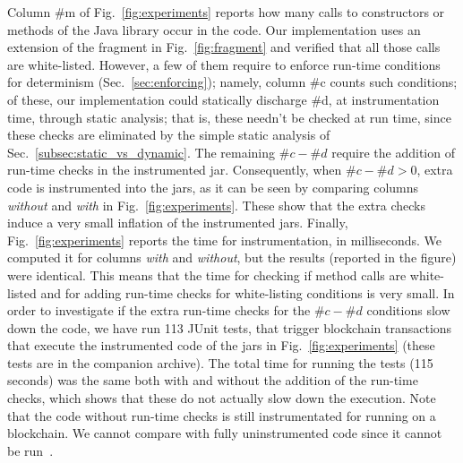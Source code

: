 Column \#m of Fig.~\ref{fig:experiments} reports how many calls to constructors
or methods of the Java library occur in the code. Our implementation
uses an extension of the fragment in Fig.~\ref{fig:fragment}
and verified that all those calls are white-listed.
However, a few of them require to enforce run-time conditions for determinism
(Sec.~\ref{sec:enforcing}); namely, column \#c counts such conditions;
of these, our implementation could statically discharge \#d, at instrumentation time,
through static analysis; that is, these needn't
be checked at run time, since these checks are eliminated by the simple
static analysis of Sec.~\ref{subsec:static_vs_dynamic}. The remaining
$\#c - \#d$ require the addition of run-time checks in the instrumented jar. Consequently,
when $\#c - \#d > 0$, extra code is instrumented into the jars, as it can be seen by comparing
columns \emph{without} and \emph{with} in Fig.~\ref{fig:experiments}. These
show that the extra checks induce a very small inflation of the instrumented jars.
Finally, Fig.~\ref{fig:experiments} reports the time for instrumentation, in milliseconds.
We computed it for columns \emph{with} and \emph{without}, but the results
(reported in the figure) were identical. This means that the time for
checking if method calls are white-listed and for adding run-time checks for white-listing
conditions is very small.
In order to investigate if the extra run-time checks for the $\#c - \#d$ conditions
slow down the code, we have run 113 JUnit tests, that trigger blockchain transactions
that execute the instrumented code of the jars in Fig.~\ref{fig:experiments}
(these tests are in the companion archive). The total time for running the
tests (115 seconds) was the same both with and without
the addition of the run-time checks, which shows that
these do not actually slow down the execution. Note that the code without run-time checks
is still instrumentated for running on a blockchain. We cannot compare with fully uninstrumented code
since it cannot be run~\cite{Spoto19}.
